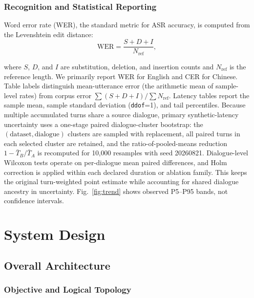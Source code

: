 \documentclass[conference]{IEEEtran}
\begin{document}
\subsubsection{Recognition and Statistical Reporting}

Word error rate (WER), the standard metric for ASR accuracy, is computed from the Levenshtein edit distance:
\begin{equation}
\mathrm{WER}=\frac{S+D+I}{N_{\mathrm{ref}}},
\label{eq:wer}
\end{equation}

where $S$, $D$, and $I$ are substitution, deletion, and insertion counts and $N_{\mathrm{ref}}$ is the reference length. We primarily report WER for English and CER for Chinese. Table labels distinguish mean-utterance error (the arithmetic mean of sample-level rates) from corpus error $\sum(S+D+I)/\sum N_{\mathrm{ref}}$. Latency tables report the sample mean, sample standard deviation (\texttt{ddof}=1), and tail percentiles. Because multiple accumulated turns share a source dialogue, primary synthetic-latency uncertainty uses a one-stage paired dialogue-cluster bootstrap: the $(\mathrm{dataset},\mathrm{dialogue})$ clusters are sampled with replacement, all paired turns in each selected cluster are retained, and the ratio-of-pooled-means reduction $1-\bar T_B/\bar T_A$ is recomputed for 10,000 resamples with seed 20260821. Dialogue-level Wilcoxon tests operate on per-dialogue mean paired differences, and Holm correction is applied within each declared duration or ablation family. This keeps the original turn-weighted point estimate while accounting for shared dialogue ancestry in uncertainty. Fig.~\ref{fig:trend} shows observed P5--P95 bands, not confidence intervals.

\section{System Design}\label{sec:design}

\subsection{Overall Architecture}

\subsubsection{Objective and Logical Topology}
\end{document}
